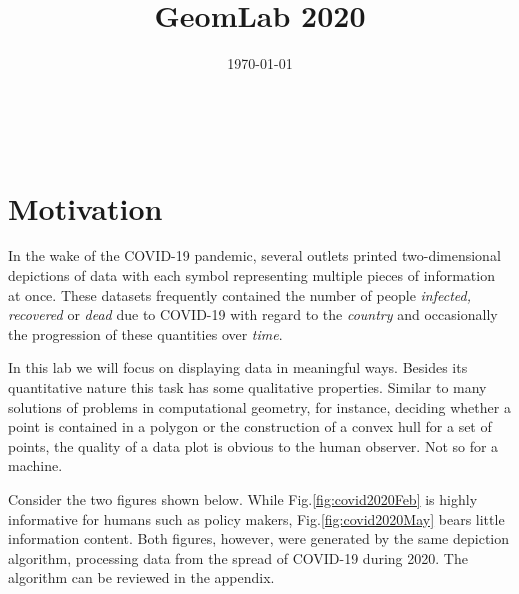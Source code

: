 \documentclass[a4paper,11pt]{article}
\makeatletter
\renewcommand{\maketitle}{
  \begin{center}
    \vspace{2ex}
    {\huge \textsc{\@title}}
    \vspace{1ex}
    \\
    \@author \hfill \@date
    \vspace{4ex}
  \end{center}
}
\makeatother
\begin{document}

\title{GeomLab 2020}
\author{}
\date{\today}
\maketitle

\tableofcontents

\newpage

\section{Motivation}

In the wake of the COVID-19 pandemic, several outlets printed two-dimensional depictions of data with each symbol representing multiple pieces of information at once. These datasets frequently contained the number of people \textit{infected, recovered} or \textit{dead} due to COVID-19 with regard to the \textit{country} and occasionally the progression of these quantities over \textit{time}.

In this lab we will focus on displaying data in meaningful ways. Besides its quantitative nature this task has some qualitative properties. Similar to many solutions of problems in computational geometry, for instance, deciding whether a point is contained in a polygon or the construction of a convex hull for a set of points, the quality of a data plot is obvious to the human observer. Not so for a machine.

Consider the two figures shown below. While Fig.\ref{fig:covid2020Feb} is highly informative for humans such as policy makers, Fig.\ref{fig:covid2020May} bears little information content. Both figures, however, were generated by the same depiction algorithm, processing data from the spread of COVID-19 during 2020. The algorithm can be reviewed in the appendix.
\end{document}
